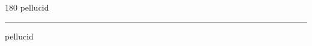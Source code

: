 
\begin{frame}
\begin{center}
\begin{turn}{180}
{\fontsize{2.5cm}{1em}\selectfont pellucid}
\end{turn}
\vspace{1em}\par  
\hrule
\vspace{1em}\par  
{\fontsize{2.5cm}{1em}\selectfont pellucid}
\end{center}
\end{frame}
